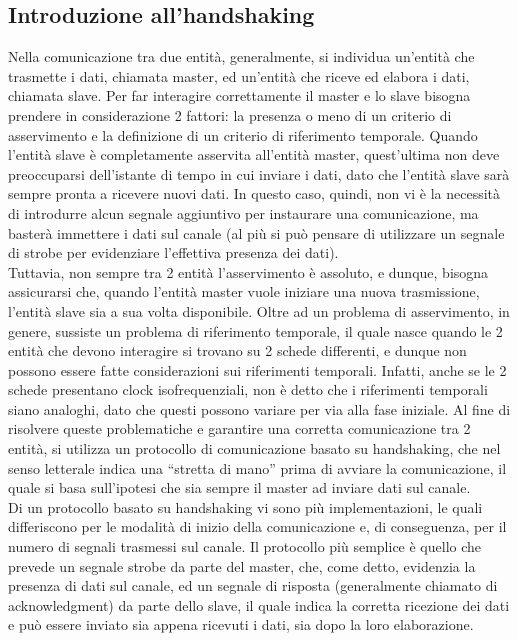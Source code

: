 \documentclass[12pt]{article}
\begin{document}
\subsection{Introduzione all'handshaking}
Nella comunicazione tra due entità, generalmente, si individua un’entità che trasmette i dati, chiamata master, ed un’entità che riceve ed elabora i dati, chiamata slave. Per far interagire correttamente il master e lo slave bisogna prendere in considerazione 2 fattori: la presenza o meno di un criterio di asservimento e la definizione di un criterio di riferimento temporale.
Quando l’entità slave è completamente asservita all’entità master, quest’ultima non deve preoccuparsi dell’istante di tempo in cui inviare i dati, dato che l’entità slave sarà sempre pronta a ricevere nuovi dati. In questo caso, quindi, non vi è la necessità di introdurre alcun segnale aggiuntivo per instaurare una comunicazione, ma basterà immettere i dati sul canale (al più si può pensare di utilizzare un segnale di strobe per evidenziare l’effettiva presenza dei dati).
\\Tuttavia, non sempre tra 2 entità l’asservimento è assoluto, e dunque, bisogna assicurarsi che, quando l’entità master vuole iniziare una nuova trasmissione, l’entità slave sia a sua volta disponibile.
Oltre ad un problema di asservimento, in genere, sussiste un problema di riferimento temporale, il quale nasce quando le 2 entità che devono interagire si trovano su 2 schede differenti, e dunque non possono essere fatte considerazioni sui riferimenti temporali. Infatti, anche se le 2 schede presentano clock isofrequenziali, non è detto che i riferimenti temporali siano analoghi, dato che questi possono variare per via alla fase iniziale.
Al fine di risolvere queste problematiche e garantire una corretta comunicazione tra 2 entità, si utilizza un protocollo di comunicazione basato su handshaking, che nel senso letterale indica una “stretta di mano” prima di avviare la comunicazione, il quale si basa sull’ipotesi che sia sempre il master ad inviare dati sul canale.
\\Di un protocollo basato su handshaking vi sono più implementazioni, le quali differiscono per le modalità di inizio della comunicazione e, di conseguenza, per il numero di segnali trasmessi sul canale.
Il protocollo più semplice è quello che prevede un segnale strobe da parte del master, che, come detto, evidenzia la presenza di dati sul canale, ed un segnale di risposta (generalmente chiamato di acknowledgment) da parte dello slave, il quale indica la corretta ricezione dei dati e può essere inviato sia appena ricevuti i dati, sia dopo la loro elaborazione.
\end{document}
